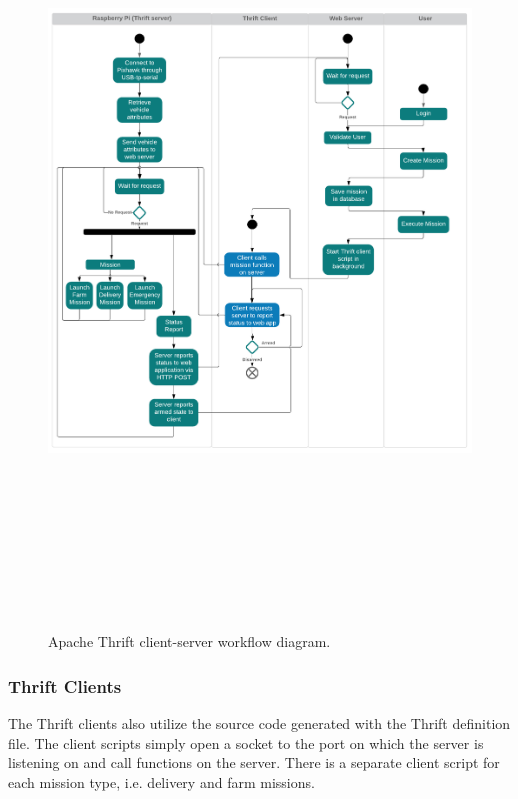 \begin{figure}[t]
	\includegraphics[width=\textwidth, height=21cm]{figures/Ch3/Apache_Thrift_Server.png}
	\caption{Apache Thrift client-server workflow diagram.}
	\label{fig:thrift_workflow}
\end{figure}
\FloatBarrier

\subsubsection{Thrift Clients}
The Thrift clients also utilize the source code generated with the Thrift definition file. The client scripts simply open a socket to the port on which the server is listening on and call functions on the server. There is a separate client script for each mission type, i.e. delivery and farm missions. 

